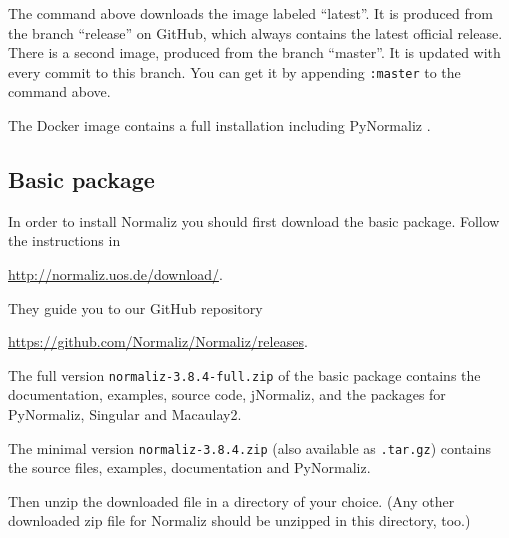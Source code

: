 \documentclass[12pt,a4paper]{scrartcl}
\theoremstyle{definition}
\def\ttt{\texttt}
\def\version{3.8.4}
\def\NmzDir{normaliz-\version}
\begin{document}
The command above downloads the image labeled ``latest''. It is produced from the branch ``release'' on GitHub, which always contains the latest official release. There is a second image, produced from the branch ``master''. It is updated with every commit to this branch. You can get it by appending \verb|:master| to the command above.

The Docker image contains a full installation including PyNormaliz .

\subsection{Basic package}
In order to install Normaliz you should first download the
basic package. Follow the instructions in
\begin{center}
\url{http://normaliz.uos.de/download/}.
\end{center}
They guide you to our GitHub repository
\begin{center}
	\url{https://github.com/Normaliz/Normaliz/releases}.
\end{center}

The full version \ttt{\NmzDir-full.zip} of the basic package contains the documentation, examples, source
code, jNormaliz, and the packages for PyNormaliz, Singular
and Macaulay2. 


The minimal version \ttt{\NmzDir.zip} (also available as \ttt{.tar.gz}) contains the source files, examples, documentation and PyNormaliz.

Then unzip the downloaded file in a directory of your choice. (Any other
downloaded zip file for Normaliz should be unzipped in this
directory, too.)
\end{document}
